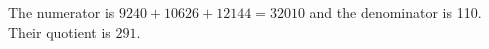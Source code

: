 The numerator is $9240+10626+12144=32010$ and the denominator is 110. Their quotient is $\boxed{291}$.

